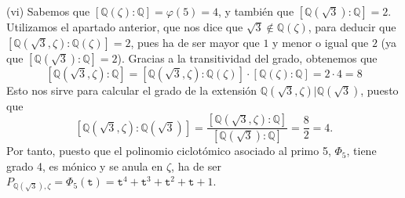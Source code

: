 (vi) Sabemos que $[\mathbb{Q}(\zeta):\mathbb{Q}] = \varphi(5) = 4$, y también que $[\mathbb{Q}(\sqrt{3}):\mathbb{Q}] = 2$. Utilizamos el apartado anterior, que nos dice que $\sqrt{3} \notin \mathbb{Q}(\zeta)$, para deducir que $[\mathbb{Q}(\sqrt{3}, \zeta):\mathbb{Q}(\zeta)] = 2$, pues ha de ser mayor que $1$ y menor o igual que $2$ (ya que $[\mathbb{Q}(\sqrt{3}):\mathbb{Q}] = 2$). Gracias a la transitividad del grado, obtenemos que
$$[\mathbb{Q}(\sqrt{3}, \zeta):\mathbb{Q}] = [\mathbb{Q}(\sqrt{3}, \zeta):\mathbb{Q}(\zeta)]\cdot[\mathbb{Q}(\zeta):\mathbb{Q}] = 2 \cdot 4 = 8$$
Esto nos sirve para calcular el grado de la extensión $\mathbb{Q}(\sqrt{3}, \zeta)|\mathbb{Q}(\sqrt{3})$, puesto que
$$[\mathbb{Q}(\sqrt{3}, \zeta):\mathbb{Q}(\sqrt{3})] = \frac{[\mathbb{Q}(\sqrt{3}, \zeta):\mathbb{Q}]}{[\mathbb{Q}(\sqrt{3}):\mathbb{Q}]} = \frac{8}{2} = 4.$$
Por tanto, puesto que el polinomio ciclotómico asociado al primo 5, $\Phi_5$, tiene grado 4, es mónico y se anula en $\zeta$, ha de ser $P_{\mathbb{Q}(\sqrt{3}),\zeta} = \Phi_5(\mathtt{t})=\mathtt{t}^4+\mathtt{t}^3+\mathtt{t}^2+\mathtt{t}+1$.